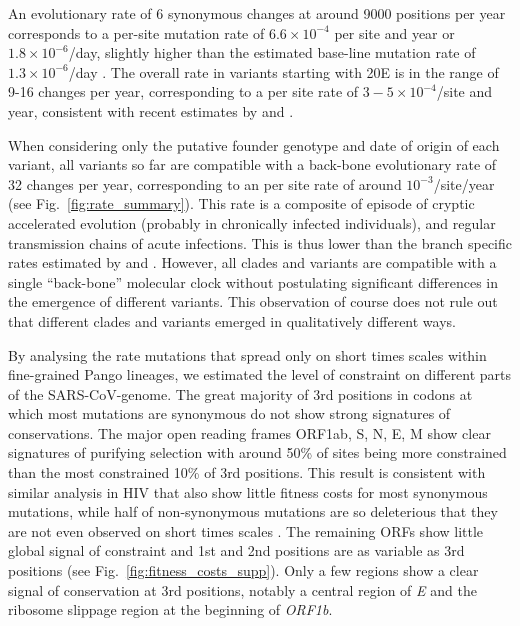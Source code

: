 \documentclass[aps,rmp, twocolumn]{revtex4}
\begin{document}
An evolutionary rate of 6 synonymous changes at around 9000 positions per year corresponds to a per-site mutation rate of $6.6\times 10^{-4}$ per site and year or $1.8\times 10^{-6}$/day, slightly higher than the estimated base-line mutation rate of $1.3\times 10^{-6}$/day \citep{amicone_mutation_2022}.
The overall rate in variants starting with 20E is in the range of 9-16 changes per year, corresponding to a per site rate of $3 - 5\times 10^{-4}$/site and year, consistent with recent estimates by \citet{hill_origins_2022} and \citet{tay_emergence_2022}.

When considering only the putative founder genotype and date of origin of each variant, all variants so far are compatible with a back-bone evolutionary rate of 32 changes per year, corresponding to an per site rate of around $10^{-3}$/site/year (see Fig.~\ref{fig:rate_summary}).
This rate is a composite of episode of cryptic accelerated evolution (probably in chronically infected individuals), and regular transmission chains of acute infections.
This is thus lower than the branch specific rates estimated by \citet{hill_origins_2022} and \citet{tay_emergence_2022}.
However, all clades and variants are compatible with a single ``back-bone'' molecular clock without postulating significant differences in the emergence of different variants.
This observation of course does not rule out that different clades and variants emerged in qualitatively different ways.

By analysing the rate mutations that spread only on short times scales within fine-grained Pango lineages, we estimated the level of constraint on different parts of the SARS-CoV-genome.
The great majority of 3rd positions in codons at which  most mutations are synonymous do not show strong signatures of conservations.
The major open reading frames ORF1ab, S, N, E, M show clear signatures of purifying selection with around 50\% of sites being more constrained than the most constrained 10\% of 3rd positions.
This result is consistent with similar analysis in HIV that also show little fitness costs for most synonymous mutations, while half of non-synonymous mutations are so deleterious that they are not even observed on short times scales \citep{zanini_vivo_2017}.
The remaining ORFs show little global signal of constraint and 1st and 2nd positions are as variable as 3rd positions (see Fig.~\ref{fig:fitness_costs_supp}).
Only a few regions show a clear signal of conservation at 3rd positions, notably a central region of \emph{E} and the ribosome slippage region at the beginning of \emph{ORF1b}.
\end{document}
